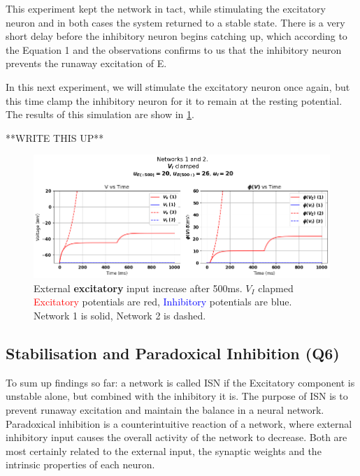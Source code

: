 \documentclass[10pt,twocolumn]{article}
\begin{document}
This experiment kept the network in tact, while stimulating the
excitatory neuron and in both cases the system returned to a
stable state. There is a very short delay before the inhibitory
neuron begins catching up, which according to the Equation 1 and
the observations confirms to us that the inhibitory neuron prevents
the runaway excitation of E.

In this next experiment, we will stimulate
the excitatory neuron once again, but this time clamp the inhibitory
neuron for it to remain at the resting potential. The results of this
simulation are show in \ref{fig:e-input-clamped}.

**WRITE THIS UP**

\begin{figure}
    \centering
    \captionsetup{justification=centering}
    \includegraphics[width=1\textwidth]{images/12-E_input_V_I_clamped.png}
    \caption{External \textbf{excitatory} input increase after 500ms. $V_I$ clapmed \\
        \textcolor{red}{Excitatory} potentials are red, \textcolor{blue}{Inhibitory} potentials are blue.\\
        Network 1 is solid, Network 2 is dashed.}
    \label{fig:e-input-clamped}
\end{figure}

\subsection{Stabilisation and Paradoxical Inhibition (Q6)}
To sum up findings so far: a network is called ISN if the Excitatory component is unstable
alone, but combined with the inhibitory it is.
The purpose of ISN is to prevent runaway excitation and
maintain the balance in a neural network. Paradoxical inhibition is
a counterintuitive reaction of a network, where external inhibitory input
causes the overall activity of the network to decrease.
Both are most certainly related to the external input, the synaptic weights
and the intrinsic properties of each neuron. 
\end{document}

